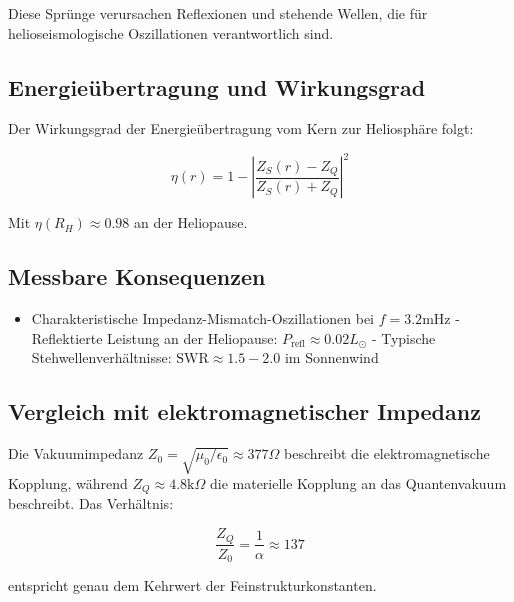 Diese Sprünge verursachen Reflexionen und stehende Wellen, die für helioseismologische Oszillationen verantwortlich sind.

\subsection{Energieübertragung und Wirkungsgrad}

Der Wirkungsgrad der Energieübertragung vom Kern zur Heliosphäre folgt:

\[
\eta(r) = 1 - \left|\frac{Z_S(r) - Z_Q}{Z_S(r) + Z_Q}\right|^2
\]

Mit $\eta(R_H) \approx 0.98$ an der Heliopause.

\subsection{Messbare Konsequenzen}

\begin{itemize}
\item Charakteristische Impedanz-Mismatch-Oszillationen bei $f = 3.2  \text{mHz}$
- Reflektierte Leistung an der Heliopause: $P_{\text{refl}} \approx 0.02 L_\odot$
- Typische Stehwellenverhältnisse: $\text{SWR} \approx 1.5-2.0$ im Sonnenwind
\end{itemize}

\subsection{Vergleich mit elektromagnetischer Impedanz}

Die Vakuumimpedanz $Z_0 = \sqrt{\mu_0/\epsilon_0} \approx 377  \Omega$ beschreibt die elektromagnetische Kopplung, während $Z_Q \approx 4.8  \text{k}\Omega$ die materielle Kopplung an das Quantenvakuum beschreibt. Das Verhältnis:

\[
\frac{Z_Q}{Z_0} = \frac{1}{\alpha} \approx 137
\]

entspricht genau dem Kehrwert der Feinstrukturkonstanten.
